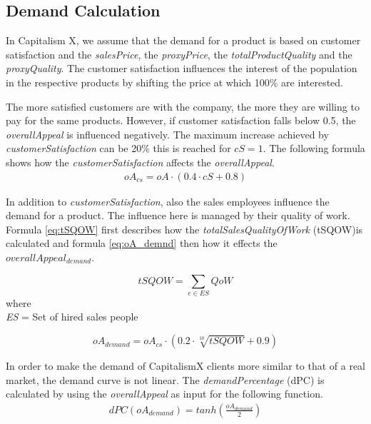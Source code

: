 \subsection{Demand Calculation} \label{demandCalc}

In Capitalism X, we assume that the demand for a product is based on customer satisfaction and the \textit{salesPrice}, the \textit{proxyPrice}, the \textit{totalProductQuality} and the \textit{proxyQuality}. 
The customer satisfaction influences the interest of the population in the respective products by shifting the price at which 100\% are interested.
 
The more satisfied customers are with the company, the more they are willing to pay for the same products. However, if customer satisfaction falls below 0.5, the \textit{overallAppeal} is influenced negatively. The maximum increase achieved by \textit{customerSatisfaction} can be 20\% this is reached for $cS = 1$. The following formula shows how the \textit{customerSatisfaction} affects the \textit{overallAppeal}.
\begin{equation}
\label{func:demandPrice}
\begin{aligned}
 oA_{cs} = oA \cdot (0.4 \cdot cS + 0.8)
\end{aligned}
\end{equation}

In addition to \textit{customerSatisfaction}, also the sales employees influence the demand for a product. The influence here is managed by their quality of work. Formula \ref{eq:tSQOW} first describes how the \textit{totalSalesQualityOfWork} (\gls{tSQOW})is calculated and formula \ref{eq:oA_demnd} then how it effects the \textit{$overallAppeal_{demand}$}.

\begin{center}
\begin{equation}
tSQOW=\sum_{e \in ES}{QoW}
\label{eq:tSQOW}
\end{equation}
where \\
\textit{ES} = Set of hired sales people
\end{center}

\begin{equation}
    oA_{demand} = oA_{cs} \cdot ( 0.2 \cdot \sqrt[10]{tSQOW} + 0.9)   
\label{eq:oA_demnd}
\end{equation}

In order to make the demand of CapitalismX clients more similar to that of a real market, the demand curve is not linear. The \textit{demandPercentage} (\gls{dPC}) is calculated by using the \textit{overallAppeal} as input for the following function. 
\begin{equation}
\label{func:demandPercentage}
\begin{aligned}
dPC(oA_{demand}) = tanh(\frac{oA_{demand}}{2})
\end{aligned}
\end{equation}

